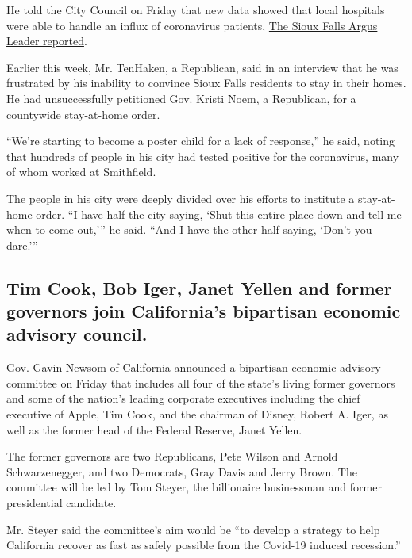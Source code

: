 He told the City Council on Friday that new data showed that local
hospitals were able to handle an influx of coronavirus patients,
\href{https://www.argusleader.com/story/news/crime/2020/04/17/coronavirus-update-covid-19-sioux-falls-after-cdc-tours-smithfield/5151219002/}{The
Sioux Falls Argus Leader reported}.

Earlier this week, Mr. TenHaken, a Republican, said in an interview that
he was frustrated by his inability to convince Sioux Falls residents to
stay in their homes. He had unsuccessfully petitioned Gov. Kristi Noem,
a Republican, for a countywide stay-at-home order.

``We're starting to become a poster child for a lack of response,'' he
said, noting that hundreds of people in his city had tested positive for
the coronavirus, many of whom worked at Smithfield.

The people in his city were deeply divided over his efforts to institute
a stay-at-home order. ``I have half the city saying, `Shut this entire
place down and tell me when to come out,''' he said. ``And I have the
other half saying, `Don't you dare.'''

\hypertarget{tim-cook-bob-iger-janet-yellen-and-former-governors-join-californias-bipartisan-economic-advisory-council}{%
\subsection{Tim Cook, Bob Iger, Janet Yellen and former governors join
California's bipartisan economic advisory
council.}\label{tim-cook-bob-iger-janet-yellen-and-former-governors-join-californias-bipartisan-economic-advisory-council}}

Gov. Gavin Newsom of California announced a bipartisan economic advisory
committee on Friday that includes all four of the state's living former
governors and some of the nation's leading corporate executives
including the chief executive of Apple, Tim Cook, and the chairman of
Disney, Robert A. Iger, as well as the former head of the Federal
Reserve, Janet Yellen.

The former governors are two Republicans, Pete Wilson and Arnold
Schwarzenegger, and two Democrats, Gray Davis and Jerry Brown. The
committee will be led by Tom Steyer, the billionaire businessman and
former presidential candidate.

Mr. Steyer said the committee's aim would be ``to develop a strategy to
help California recover as fast as safely possible from the Covid-19
induced recession.''

